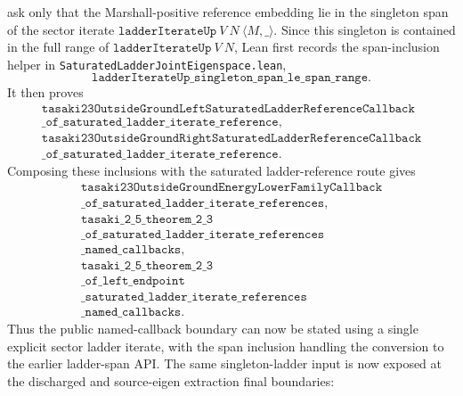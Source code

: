 \documentclass[a4paper,11pt]{article}
\begin{document}
ask only that the Marshall-positive reference embedding lie in the singleton
span of the sector iterate
\(\texttt{ladderIterateUp}\ V\ N\ \langle M,\_\rangle\).  Since this
singleton is contained in the full range of
\(\texttt{ladderIterateUp}\ V\ N\), Lean first records the span-inclusion
helper in \texttt{SaturatedLadderJointEigenspace.lean},
\[
\texttt{ladderIterateUp\_singleton\_span\_le\_span\_range}.
\]
It then proves
\[
\begin{gathered}
\texttt{tasaki23OutsideGroundLeftSaturatedLadderReferenceCallback}\\
\texttt{\_of\_saturated\_ladder\_iterate\_reference},\\
\texttt{tasaki23OutsideGroundRightSaturatedLadderReferenceCallback}\\
\texttt{\_of\_saturated\_ladder\_iterate\_reference}.
\end{gathered}
\]
Composing these inclusions with the saturated ladder-reference route gives
\[
\begin{gathered}
\texttt{tasaki23OutsideGroundEnergyLowerFamilyCallback}\\
\texttt{\_of\_saturated\_ladder\_iterate\_references},\\
\texttt{tasaki\_2\_5\_theorem\_2\_3}\\
\texttt{\_of\_saturated\_ladder\_iterate\_references}\\
\texttt{\_named\_callbacks},\\
\texttt{tasaki\_2\_5\_theorem\_2\_3}\\
\texttt{\_of\_left\_endpoint}\\
\texttt{\_saturated\_ladder\_iterate\_references}\\
\texttt{\_named\_callbacks}.
\end{gathered}
\]
Thus the public named-callback boundary can now be stated using a single
explicit sector ladder iterate, with the span inclusion handling the
conversion to the earlier ladder-span API.
The same singleton-ladder input is now exposed at the discharged and
source-eigen extraction final boundaries:
\end{document}
